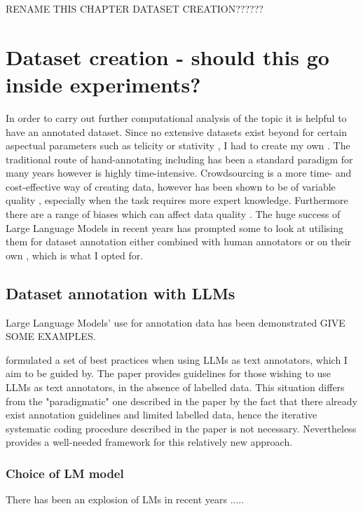 
RENAME THIS CHAPTER DATASET CREATION??????

\section{Dataset creation - should this go inside experiments?}
\label{sec:dataset_creation}
In order to carry out further computational analysis of the topic it is helpful to have an annotated dataset. Since no extensive datasets exist beyond for certain aspectual parameters such as telicity \citep{friedrich-gateva-2017-classification} or stativity \citep{Friedrich2014AutomaticPO}, I had to create my own \citep{friedrich-etal-2023-kind}. The traditional route of hand-annotating including has been a standard paradigm for many years however is highly time-intensive. Crowdsourcing is a more time- and cost-effective way of creating data, however has been shown to be of variable quality \citep{li2024comparative}, especially when the task requires more expert knowledge. Furthermore there are a range of biases which can affect data quality \citep{Beck2023}. The huge success of Large Language Models in recent years has prompted some to look at utilising them for dataset annotation either combined with human annotators \citep{goel2023llms} or on their own \citep{he2023annollm, llmsForPragAndDiscAnalysis, Gilardi_2023}, which is what I opted for.

\subsection{Dataset annotation with LLMs}
Large Language Models' use for annotation data has been demonstrated GIVE SOME EXAMPLES.  

\citet{törnberg2024best} formulated a set of best practices when using LLMs as text annotators, which I aim to be guided by. The paper provides guidelines for those wishing to use LLMs as text annotators, in the absence of labelled data. This situation differs from the "paradigmatic" one described in the paper by the fact that there already exist annotation guidelines and limited labelled data, hence the iterative systematic coding procedure described in the paper is not necessary. Nevertheless \citet{törnberg2024best} provides a well-needed framework for this relatively new approach. 

\subsubsection*{Choice of LM model}
There has been an explosion of LMs in recent years .....

